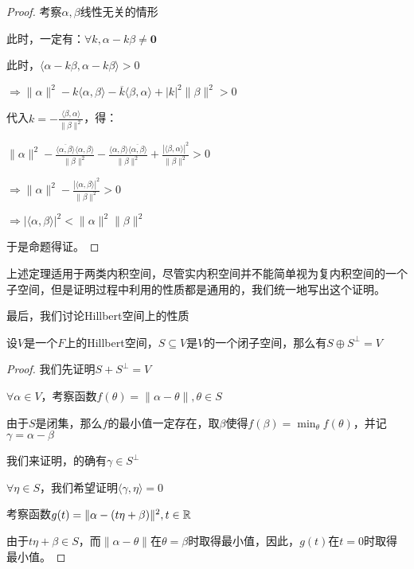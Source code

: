 \documentclass[12pt, a4paper, oneside, UTF8]{ctexbook}
\begin{document}
\begin{para}{0}
\begin{proof}
						考察$\alpha ,\beta $线性无关的情形

						此时，一定有：$\forall k,\alpha -k\beta \neq\mathbf{0}$

						此时，$\langle \alpha -k\beta ,\alpha -k\beta \rangle > 0$

						$\Rightarrow \|\alpha \|^2-k \langle \alpha ,\beta \rangle-\overline{k}\langle \beta ,\alpha \rangle + |k|^2 \|\beta \|^2 > 0$

						代入$k = -\frac{\langle \beta ,\alpha \rangle}{\|\beta \|^2}$，得：

						$\|\alpha \|^2 - \frac{\overline{\langle \alpha ,\beta \rangle}\langle \alpha ,\beta \rangle}{\|\beta \|^2}-\frac{\langle\alpha ,\beta \rangle\overline{\langle \alpha ,\beta  \rangle}}{\|\beta \|^2} + \frac{|\langle \beta ,\alpha \rangle|^2}{\|\beta \|^2} > 0$

						$\Rightarrow \|\alpha \|^2 - \frac{|\langle \alpha ,\beta \rangle|^2}{\|\beta \|^2} > 0$

						$\Rightarrow |\langle \alpha ,\beta \rangle|^2 < \|\alpha \|^2 \|\beta \|^2$
						
						于是命题得证。
					\end{proof}
					上述定理适用于两类内积空间，尽管实内积空间并不能简单视为复内积空间的一个子空间，但是证明过程中利用的性质都是通用的，我们统一地写出这个证明。
				\point{}
					
					最后，我们讨论Hillbert空间上的性质
					\begin{proposition}
						设$V$是一个$F$上的Hillbert空间，$S \subseteq V$是$V$的一个闭子空间，那么有$S \oplus S^{\perp}=V$
					\end{proposition}
					\begin{proof}
						我们先证明$S + S^{\perp} = V$

						$\forall \alpha \in V$，考察函数$f(\theta )=\|\alpha -\theta \|,\theta \in S$

						由于$S$是闭集，那么$f$的最小值一定存在，取$\beta $使得$f(\beta )=\min_\theta  f(\theta )$，并记$\gamma =\alpha -\beta $

						我们来证明，的确有$\gamma \in S^{\perp}$

						$\forall \eta \in S$，我们希望证明$\langle \gamma ,\eta \rangle = 0$

						考察函数$g(t)=\|\alpha - (t\eta + \beta )\|^2,t \in \mathbb{R}$

						由于$t\eta +\beta \in S$，而$\|\alpha -\theta  \|$在$\theta =\beta $时取得最小值，因此，$g(t)$在$t=0$时取得最小值。


\end{proof}
\end{para}
\end{document}
